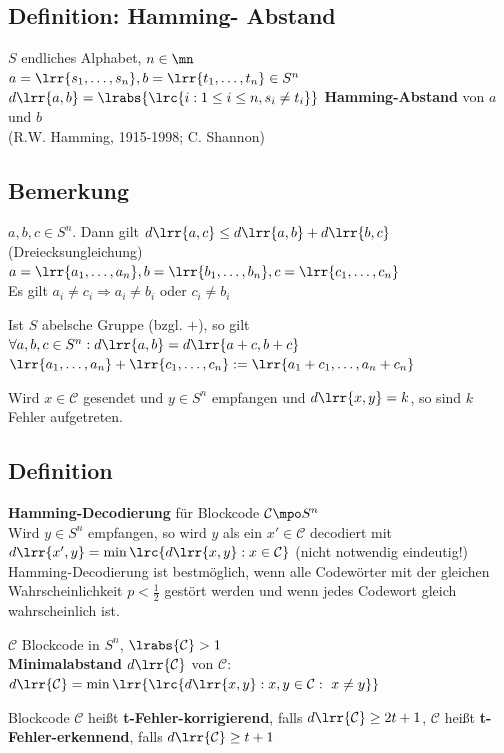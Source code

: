 	\subsection{Definition: Hamming- Abstand}
		$S$ endliches Alphabet, $n\in\mn$\\
		$a=\lrr{s_1,\dots,s_n}, b=\lrr{t_1,\dots,t_n}\in S^n$\\
		$d\lrr{a,b}=\lrabs{\lrc{i:1\leq i\leq n, s_i\neq t_i}}$ \textbf{Hamming-Abstand} von $a$ und $b$\\
		(R.W. Hamming, 1915-1998; C. Shannon)
		
	\subsection{Bemerkung}
			\item $a,b,c\in S^n$. Dann gilt $d\lrr{a,c}\leq d\lrr{a,b}+d\lrr{b,c}$ (Dreiecksungleichung)\\
				$a=\lrr{a_1,\dots,a_n}, b=\lrr{b_1,\dots,b_n}, c=\lrr{c_1,\dots,c_n}$\\
				Es gilt $a_i\neq c_i\Rightarrow a_i\neq b_i$ oder $c_i\neq b_i$
			\item Ist $S$ abelsche Gruppe (bzgl. $+$), so gilt\\
				$\forall a,b,c\in S^n: d\lrr{a,b}=d\lrr{a+c,b+c}$\\
				$\lrr{a_1,\dots,a_n}+\lrr{c_1,\dots,c_n}:=\lrr{a_1+c_1,\dots, a_n+c_n}$
			\item Wird $x\in\mathcal{C}$ gesendet und $y\in S^n$ empfangen und $d\lrr{x,y}=k$, so sind $k$ Fehler aufgetreten.
		\subExEnd
	
	\newpage
	\subsection{Definition}
			\item \textbf{Hamming-Decodierung} für Blockcode $\mathcal{C}\mpo S^n$\\
				Wird $y\in S^n$ empfangen, so wird $y$ als ein $x'\in\mathcal{C}$ decodiert mit\\
				$d\lrr{x',y}=\min\lrc{d\lrr{x,y}:x\in\mathcal{C}}$ (nicht notwendig eindeutig!)\\
				Hamming-Decodierung ist bestmöglich, wenn alle Codewörter mit der gleichen\\Wahrscheinlichkeit $p<\frac{1}{2}$ gestört werden und wenn jedes Codewort gleich wahrscheinlich ist.
			\item $\mathcal{C}$ Blockcode in $S^n$, $\lrabs{\mathcal{C}}>1$\\
				\textbf{Minimalabstand} $d\lrr{\mathcal{C}}$ von $\mathcal{C}$: $d\lrr{\mathcal{C}}=\min\lrr{\lrc{d\lrr{x,y}:x,y\in\mathcal{C}:\ x\neq y}}$
			\item Blockcode $\mathcal{C}$ heißt \textbf{t-Fehler-korrigierend}, falls $d\lrr{\mathcal{C}}\geq 2t+1$, $\mathcal{C}$ heißt \textbf{t-Fehler-erkennend}, falls $d\lrr{\mathcal{C}}\geq t+1$
		\subExEnd
		

